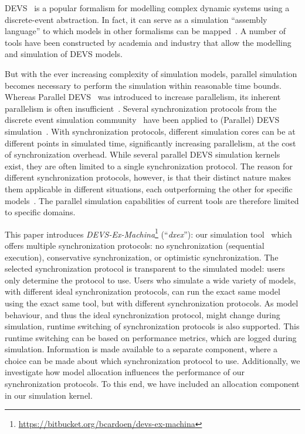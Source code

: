 \textsf{DEVS}~\cite{ClassicDEVS} is a popular formalism for modelling complex dynamic systems using a discrete-event abstraction.
In fact, it can serve as a simulation ``assembly language'' to which models in other formalisms can be mapped~\cite{DEVSbase}.
A number of tools have been constructed by academia and industry that allow the modelling and simulation of \textsf{DEVS} models.

But with the ever increasing complexity of simulation models, parallel simulation becomes necessary to perform the simulation within reasonable time bounds.
Whereas \textsf{Parallel DEVS}~\cite{ParallelDEVS} was introduced to increase parallelism, its inherent parallelism is often insufficient~\cite{Himmelspach}.
Several synchronization protocols from the discrete event simulation community~\cite{FujimotoBook} have been applied to (\textsf{Parallel}) \textsf{DEVS} simulation~\cite{globaltimewarp}.
With synchronization protocols, different simulation cores can be at different points in simulated time, significantly increasing parallelism, at the cost of synchronization overhead.
While several parallel \textsf{DEVS} simulation kernels exist, they are often limited to a single synchronization protocol.
The reason for different synchronization protocols, however, is that their distinct nature makes them applicable in different situations, each outperforming the other for specific models~\cite{Jafer}.
The parallel simulation capabilities of current tools are therefore limited to specific domains.

This paper introduces \textit{DEVS-Ex-Machina}\footnote{\url{https://bitbucket.org/bcardoen/devs-ex-machina}} (``\textit{dxex}''): our simulation tool~\cite{dxex} which offers multiple synchronization protocols: no synchronization (sequential execution), conservative synchronization, or optimistic synchronization.
The selected synchronization protocol is transparent to the simulated model: users only determine the protocol to use.
Users who simulate a wide variety of models, with different ideal synchronization protocols, can run the exact same model using the exact same tool, but with different synchronization protocols.
As model behaviour, and thus the ideal synchronization protocol, might change during simulation, runtime switching of synchronization protocols is also supported.
This runtime switching can be based on performance metrics, which are logged during simulation.
Information is made available to a separate component, where a choice can be made about which synchronization protocol to use. %
Additionally, we investigate how model allocation influences the performance of our synchronization protocols.
To this end, we have included an allocation component in our simulation kernel.

